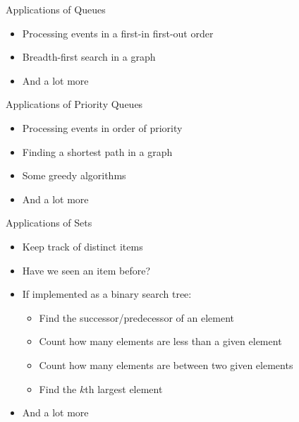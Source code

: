 \documentclass{beamer}
\begin{document}

\begin{frame}{Applications of Queues}
    \begin{itemize}
        \item<1-> Processing events in a first-in first-out order
        \item<2-> Breadth-first search in a graph
        \item<3-> And a lot more
    \end{itemize}
\end{frame}

\begin{frame}{Applications of Priority Queues}
    \begin{itemize}
        \item<1-> Processing events in order of priority
        \item<2-> Finding a shortest path in a graph
        \item<3-> Some greedy algorithms
        \item<4-> And a lot more
    \end{itemize}
\end{frame}

\begin{frame}{Applications of Sets}
    \begin{itemize}
        \item<1-> Keep track of distinct items
        \item<2-> Have we seen an item before?
        \item<3-> If implemented as a binary search tree:
        \begin{itemize}
            \item<4-> Find the successor/predecessor of an element
            \item<5-> Count how many elements are less than a given element
            \item<6-> Count how many elements are between two given elements
            \item<7-> Find the $k$th largest element
        \end{itemize}
        \item<8-> And a lot more
    \end{itemize}
\end{frame}
\end{document}
